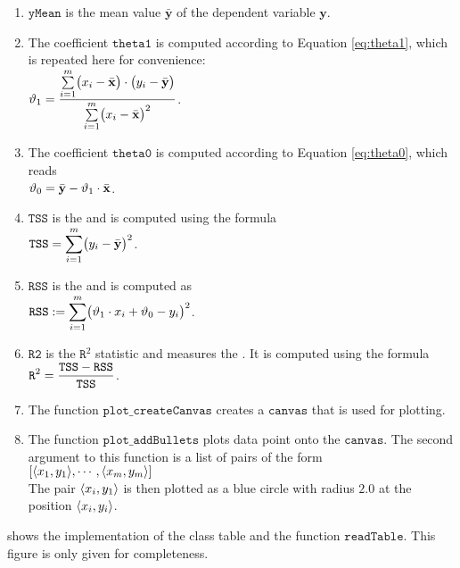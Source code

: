 \begin{enumerate}
\item $\mathtt{yMean}$ is the mean value $\bar{\mathbf{y}}$ of the dependent variable $\mathbf{y}$. 
\item The coefficient $\mathtt{theta1}$ is computed according to Equation \ref{eq:theta1}, which is repeated
      here for convenience:
      \\[0.2cm]
      \hspace*{1.3cm}
      $\displaystyle\vartheta_1 = \frac{\sum\limits_{i=1}^m \bigl(x_i - \bar{\mathbf{x}}\bigr) \cdot \bigl(y_i - \bar{\mathbf{y}}\bigr)}{
                        \sum\limits_{i=1}^m \bigl(x_i - \bar{\mathbf{x}}\bigr)^2}  
      $.
\item The coefficient $\mathtt{theta0}$ is computed according to Equation \ref{eq:theta0}, which reads
      \\[0.2cm]
      \hspace*{1.3cm}
      $\displaystyle\vartheta_0 = \bar{\mathbf{y}} - \vartheta_1 \cdot \bar{\mathbf{x}}$.
\item $\mathtt{TSS}$ is the  and is computed using the formula
      \\[0.2cm]
      \hspace*{1.3cm}
      $\displaystyle\mathtt{TSS} = \sum\limits_{i=1}^m \bigl(y_i - \bar{\mathbf{y}}\bigr)^2$.
\item $\mathtt{RSS}$ is the  and is computed as
      \\[0.2cm]
      \hspace*{1.3cm}
      $\displaystyle\mathtt{RSS} := \sum\limits_{i=1}^m \bigl(\vartheta_1 \cdot x_i + \vartheta_0 - y_i\bigr)^2$.
\item $\mathtt{R2}$ is the $\mathtt{R}^2$ statistic and measures the .
      It is computed using the formula
      \\[0.2cm]
      \hspace*{1.3cm}
      $\displaystyle \mathtt{R}^2 = \frac{\mathtt{TSS} - \mathtt{RSS}}{\mathtt{TSS}}$.
\item The function $\mathtt{plot\_createCanvas}$ creates a $\mathtt{canvas}$ that is used for plotting.
\item The function $\mathtt{plot\_addBullets}$ plots data point onto the $\mathtt{canvas}$.
      The second argument to this function is a list of pairs of the form
      \\[0.2cm]
      \hspace*{1.3cm}
      $[ \pair(x_1,y_1), \cdots, \pair(x_m,y_m)]$
      \\[0.2cm]
      The pair $\pair(x_i,y_1)$ is then plotted as a blue circle with radius $2.0$ at the position
      $\pair(x_i, y_i)$.
\end{enumerate}
 shows the implementation of the class table and the function $\mathtt{readTable}$.  This figure is
only given for completeness.

